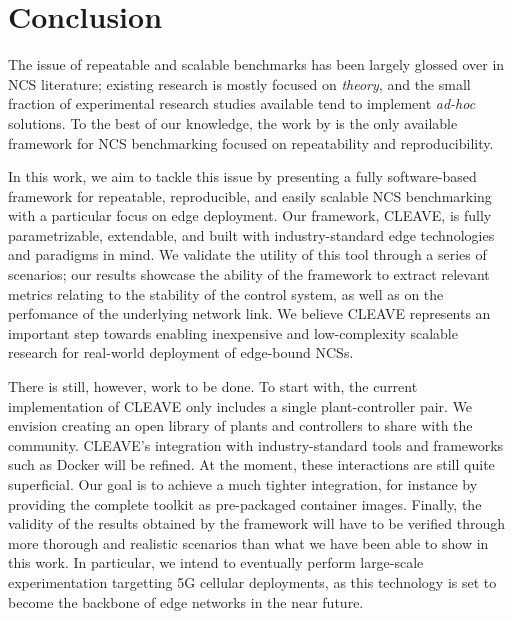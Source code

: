 \section{Conclusion}\label{sec:conclusion}

The issue of repeatable and scalable benchmarks has been largely glossed over in \ac{NCS} literature; existing research is mostly focused on \emph{theory}, and the small fraction of experimental research studies available tend to implement \emph{ad-hoc} solutions.
To the best of our knowledge, the work by \textcite{Zoppi2020NCSBench} is the only available framework for \ac{NCS} benchmarking focused on repeatability and reproducibility.

In this work, we aim to tackle this issue by presenting a fully software-based framework for repeatable, reproducible, and easily scalable \ac{NCS} benchmarking with a particular focus on edge deployment.
Our framework, \ac{CLEAVE}, is fully parametrizable, extendable, and built with industry-standard edge technologies and paradigms in mind.
We validate the utility of this tool through a series of scenarios; our results showcase the ability of the framework to extract relevant metrics relating to the stability of the control system, as well as on the perfomance of the underlying network link.
We believe \ac{CLEAVE} represents an important step towards enabling inexpensive and low-complexity scalable research for real-world deployment of edge-bound \acp{NCS}.

There is still, however, work to be done.
To start with, the current implementation of \ac{CLEAVE} only includes a single plant-controller pair.
We envision creating an open library of plants and controllers to share with the community.
\ac{CLEAVE}'s integration with industry-standard tools and frameworks such as Docker will be refined.
At the moment, these interactions are still quite superficial.
Our goal is to achieve a much tighter integration, for instance by providing the complete toolkit as pre-packaged container images.
Finally, the validity of the results obtained by the framework will have to be verified through more thorough and realistic scenarios than what we have been able to show in this work.
In particular, we intend to eventually perform large-scale experimentation targetting 5G cellular deployments, as this technology is set to become the backbone of edge networks in the near future.

